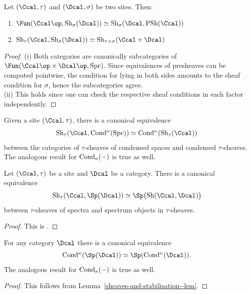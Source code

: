 \documentclass[colorinlistoftodos,article,11pt,reqno]{article}
\newcommand{\Cond}{\textup{Cond}}
\newcommand{\Spc}{\textup{Spc}}
\newcommand{\PSh}{\textup{PSh}}
\newcommand{\Sh}{\textup{Sh}}
\newcommand{\infcat}{category}
\begin{document}
\begin{appendix}
\begin{lemma} \label{condensed-sheaves--lem}
Let $(\Ccal,\tau)$ and $(\Dcal,\sigma)$ be two sites. Then:
\begin{enumerate}
\item $\Fun(\Ccal\op,\Sh_\sigma(\Dcal)) \simeq \Sh_\sigma(\Dcal,\PSh(\Ccal))$
\item $\Sh_\tau(\Ccal,\Sh_\sigma(\Dcal)) \simeq \Sh_{\tau\times\sigma}(\Ccal\times\Dcal)$
\end{enumerate}
\end{lemma}
\begin{proof}
(i) Both categories are canonically subcategories of $\Fun(\Ccal\op\times\Dcal\op,\Spc)$. Since equivalences of presheaves can be computed pointwise, the condition for lying in both sides amounts to the sheaf condition for $\sigma$, hence the subcategories agree.\\
(ii) This holds since one can check the respective sheaf conditions in each factor independently.
\end{proof}

\begin{cor} \label{condensed-sheaves--cor}
Given a site $(\Ccal,\tau)$, there is a canonical equivalence
\[
\Sh_\tau(\Ccal,\Cond^{\omega}(\Spc)) \simeq \Cond^{\omega}(\Sh_\tau(\Ccal))
\]
between the categories of $\tau$-sheaves of condensed spaces and condensed $\tau$-sheaves.
The analogous result for $\Cond_\kappa(-)$ is true as well.
\end{cor}

\begin{lemma} \label{sheaves-and-stabilisation--lem}
Let $(\Ccal,\tau)$ be a site and $\Dcal$ be a category. There is a canonical equivalence
\[
\Sh_\tau(\Ccal,\Sp(\Dcal)) \simeq \Sp\bigl( \Sh(\Ccal,\Dcal) \bigr)
\]
between $\tau$-sheaves of spectra and spectrum objects in $\tau$-sheaves.
\end{lemma}
\begin{proof}
This is \cite[1.3.2.2]{SAG}.
\end{proof}

\begin{cor} \label{condensed-and-stabilisation--cor}
For any \infcat{} $\Dcal$ there is a canonical equivalence
\[
\Cond^{\omega}(\Sp(\Dcal)) \simeq \Sp(\Cond^{\omega}(\Dcal)).
\]
The analogous result for $\Cond_\kappa(-)$ is true as well.
\end{cor}
\begin{proof}
This follows from Lemma~\ref{sheaves-and-stabilisation--lem}.
\end{proof}






\end{appendix}
\end{document}

